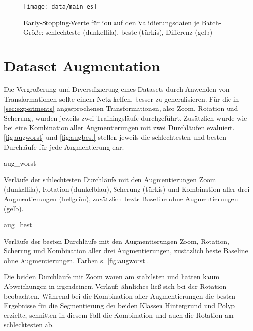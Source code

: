 \begin{figure}
	\centering
	\texttt{[image: data/main\_es]}
	\caption[Early-Stopping-Werte für \gls{iou} auf den Validierungsdaten je Batch-Größe]{Early-Stopping-Werte für \gls{iou} auf den Validierungsdaten je Batch-Größe: schlechteste (dunkellila), beste (türkis), Differenz (gelb)}
	\label{fig:es081632}
\end{figure}



\section{Dataset Augmentation}

Die Vergrößerung und Diversifizierung eines Datasets durch Anwenden von Transformationen sollte einem Netz helfen, besser zu generalisieren.
Für die in \autoref{sec:experiments} angesprochenen Transformationen, also Zoom, Rotation und Scherung, wurden jeweils zwei Trainingsläufe durchgeführt.
Zusätzlich wurde wie bei \cite{Vazquez.2017} eine Kombination aller Augmentierungen mit zwei Durchläufen evaluiert.
\autoref{fig:augworst} und \autoref{fig:augbest} stellen jeweils die schlechtesten und besten Durchläufe für jede Augmentierung dar.

\begin{losses}{aug_worst}
	\caption[Verläufe der schlechtesten Durchläufe mit Augmentierungen]{Verläufe der schlechtesten Durchläufe mit den Augmentierungen Zoom (dunkellila), Rotation (dunkelblau), Scherung (türkis) und Kombination aller drei Augmentierungen (hellgrün), zusätzlich beste Baseline ohne Augmentierungen (gelb).}
	\label{fig:augworst}
\end{losses}

\begin{losses}{aug_best}
	\caption[Verläufe der besten Durchläufe mit Augmentierungen]{Verläufe der besten Durchläufe mit den Augmentierungen Zoom, Rotation, Scherung und Kombination aller drei Augmentierungen, zusätzlich beste Baseline ohne Augmentierungen. Farben s. \autoref{fig:augworst}.}
	\label{fig:augbest}
\end{losses}

Die beiden Durchläufe mit Zoom waren am stabilsten und hatten kaum Abweichungen in irgendeinem Verlauf; ähnliches ließ sich bei der Rotation beobachten.
Während bei \cite{Vazquez.2017} die Kombination aller Augmentierungen die besten Ergebnisse für die Segmentierung der beiden Klassen Hintergrund und Polyp erzielte, schnitten in diesem Fall die Kombination und auch die Rotation am schlechtesten ab.

